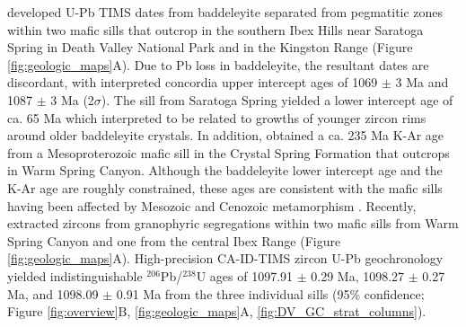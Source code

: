  developed U-Pb TIMS dates from baddeleyite separated from pegmatitic zones within two mafic sills that outcrop in the southern Ibex Hills near Saratoga Spring in Death Valley National Park and in the Kingston Range (Figure \ref{fig:geologic_maps}A). Due to Pb loss in baddeleyite, the resultant dates are discordant, with interpreted concordia upper intercept ages of 1069 $\pm$ 3 Ma and 1087 $\pm$ 3 Ma (2$\sigma$). The sill from Saratoga Spring yielded a lower intercept age of ca. 65 Ma which  interpreted to be related to growths of younger zircon rims around older baddeleyite crystals. In addition,  obtained a ca. 235 Ma K-Ar age from a Mesoproterozoic mafic sill in the Crystal Spring Formation that outcrops in Warm Spring Canyon. Although the baddeleyite lower intercept age and the K-Ar age are roughly constrained, these ages are consistent with the mafic sills having been affected by Mesozoic and Cenozoic metamorphism \cite{Snow1989a, Snow2000a}. Recently,  extracted zircons from granophyric segregations within two mafic sills from Warm Spring Canyon and one from the central Ibex Range (Figure \ref{fig:geologic_maps}A). High-precision CA-ID-TIMS zircon U-Pb geochronology yielded indistinguishable $^{206}$Pb/$^{238}$U ages of 1097.91  $\pm$  0.29 Ma, 1098.27  $\pm$  0.27 Ma, and 1098.09  $\pm$  0.91 Ma from the three individual sills (95\% confidence; Figure \ref{fig:overview}B, \ref{fig:geologic_maps}A, \ref{fig:DV_GC_strat_columns}). 

